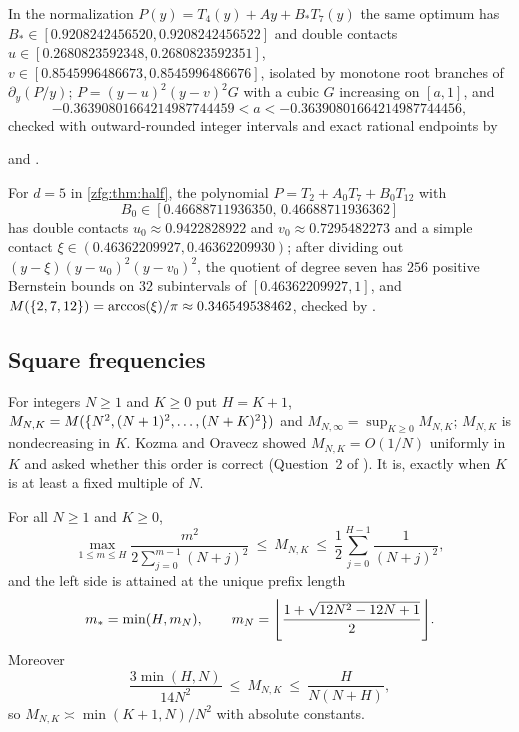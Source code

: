 \begin{remark}\label{zfg:rem:147}
In the normalization $P(y)=T_4(y)+Ay+B_*T_7(y)$ the same optimum has $B_*\in[0.9208242456520,0.9208242456522]$ and double
contacts $u\in[0.2680823592348,0.2680823592351]$, $v\in[0.8545996486673,0.8545996486676]$, isolated by monotone root
branches of $\partial_y(P/y)$; $P=(y-u)^2(y-v)^2G$ with a cubic $G$ increasing on $[a,1]$, and
\[
 -0.36390801664214987744459<a<-0.36390801664214987744456,
\]
checked with outward-rounded integer intervals and exact rational endpoints by
\begin{center} and .\end{center}
For $d=5$ in
\cref{zfg:thm:half}, the polynomial $P=T_2+A_0T_7+B_0T_{12}$ with
\[
 B_0\in[0.46688711936350,\,0.46688711936362]
\]
has double contacts $u_0\approx0.9422828922$ and $v_0\approx0.7295482273$ and a simple contact $\xi\in(0.46362209927,0.46362209930)$; after dividing out
$(y-\xi)(y-u_0)^2(y-v_0)^2$, the quotient of degree seven has $256$ positive Bernstein bounds on $32$ subintervals of
$[0.46362209927,1]$, and $M(\{2,7,12\})=\arccos(\xi)/\pi\approx0.346549538462$, checked by
.
\end{remark}

\subsection{Square frequencies}\label{zfg:sec:squares}

For integers $N\ge1$ and $K\ge0$ put $H=K+1$, $M_{N,K}=M(\{N^2,(N+1)^2,\dots,(N+K)^2\})$ and
$M_{N,\infty}=\sup_{K\ge0}M_{N,K}$; $M_{N,K}$ is nondecreasing in $K$. Kozma and Oravecz showed $M_{N,K}=O(1/N)$ uniformly in $K$
and asked whether this order is correct (Question~2 of \cite{KozmaOravecz2003Gaps}). It is, exactly when $K$ is at least a
fixed multiple of $N$.

\begin{theorem}\label{zfg:thm:squares}
For all $N\ge1$ and $K\ge0$,
\[
 \max_{1\le m\le H}\frac{m^2}{2\sum_{j=0}^{m-1}(N+j)^2}\ \le\ M_{N,K}\ \le\ \frac12\sum_{j=0}^{H-1}\frac1{(N+j)^2},
\]
and the left side is attained at the unique prefix length
\[
 m_*=\min(H,m_N),\qquad m_N=\floor*{\frac{1+\sqrt{12N^2-12N+1}}2}.
\]
Moreover
\[
 \frac{3\min(H,N)}{14N^2}\ \le\ M_{N,K}\ \le\ \frac H{N(N+H)},
\]
so $M_{N,K}\asymp\min(K+1,N)/N^2$ with absolute constants.
\end{theorem}

